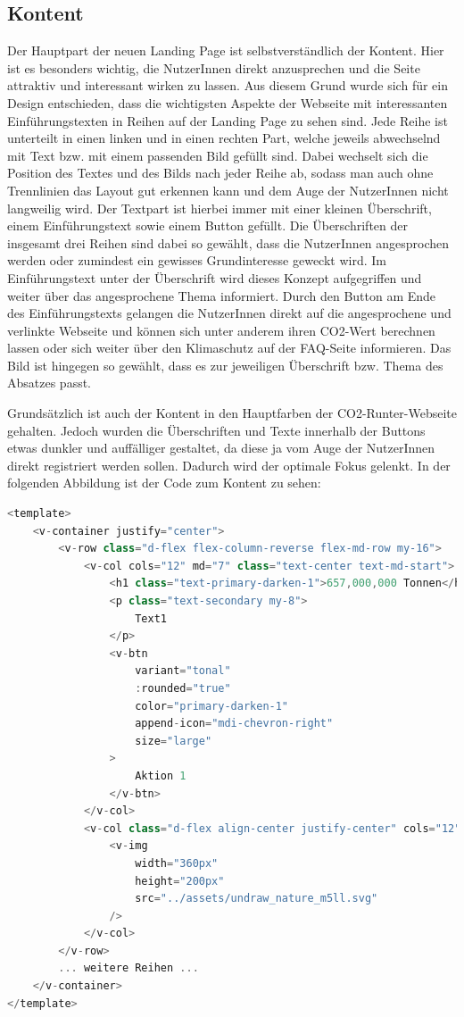 \subsection{Kontent}
Der Hauptpart der neuen Landing Page ist selbstverständlich der Kontent.
Hier ist es besonders wichtig, die NutzerInnen direkt anzusprechen und die Seite attraktiv und interessant wirken zu lassen.
Aus diesem Grund wurde sich für ein Design entschieden, dass die wichtigsten Aspekte der Webseite mit interessanten Einführungstexten in Reihen auf der Landing Page zu sehen sind.
Jede Reihe ist unterteilt in einen linken und in einen rechten Part, welche jeweils abwechselnd mit Text bzw. mit einem passenden Bild gefüllt sind.
Dabei wechselt sich die Position des Textes und des Bilds nach jeder Reihe ab, sodass man auch ohne Trennlinien das Layout gut erkennen kann und dem Auge der NutzerInnen nicht langweilig wird.
Der Textpart ist hierbei immer mit einer kleinen Überschrift, einem Einführungstext sowie einem Button gefüllt.
Die Überschriften der insgesamt drei Reihen sind dabei so gewählt, dass die NutzerInnen angesprochen werden oder zumindest ein gewisses Grundinteresse geweckt wird.
Im Einführungstext unter der Überschrift wird dieses Konzept aufgegriffen und weiter über das angesprochene Thema informiert.
Durch den Button am Ende des Einführungstexts gelangen die NutzerInnen direkt auf die angesprochene und verlinkte Webseite und können sich unter anderem ihren CO2-Wert berechnen lassen oder sich weiter über den Klimaschutz auf der FAQ-Seite informieren.
Das Bild ist hingegen so gewählt, dass es zur jeweiligen Überschrift bzw. Thema des Absatzes passt. \par
Grundsätzlich ist auch der Kontent in den Hauptfarben der CO2-Runter-Webseite gehalten.
Jedoch wurden die Überschriften und Texte innerhalb der Buttons etwas dunkler und auffälliger gestaltet, da diese ja vom Auge der NutzerInnen direkt registriert werden sollen.
Dadurch wird der optimale Fokus gelenkt.
In der folgenden Abbildung ist der Code zum Kontent zu sehen:
\newpage

\begin{lstlisting}[language={JavaScript}, caption={Home Page Kontent}]
<template>
    <v-container justify="center">
        <v-row class="d-flex flex-column-reverse flex-md-row my-16">
            <v-col cols="12" md="7" class="text-center text-md-start">
                <h1 class="text-primary-darken-1">657,000,000 Tonnen</h1>
                <p class="text-secondary my-8">
                    Text1
                </p>
                <v-btn
                    variant="tonal"
                    :rounded="true"
                    color="primary-darken-1"
                    append-icon="mdi-chevron-right"
                    size="large"
                >
                    Aktion 1
                </v-btn>
            </v-col>
            <v-col class="d-flex align-center justify-center" cols="12" md="5">
                <v-img
                    width="360px"
                    height="200px"
                    src="../assets/undraw_nature_m5ll.svg"
                />
            </v-col>
        </v-row>
        ... weitere Reihen ...
    </v-container>
</template>
\end{lstlisting}

